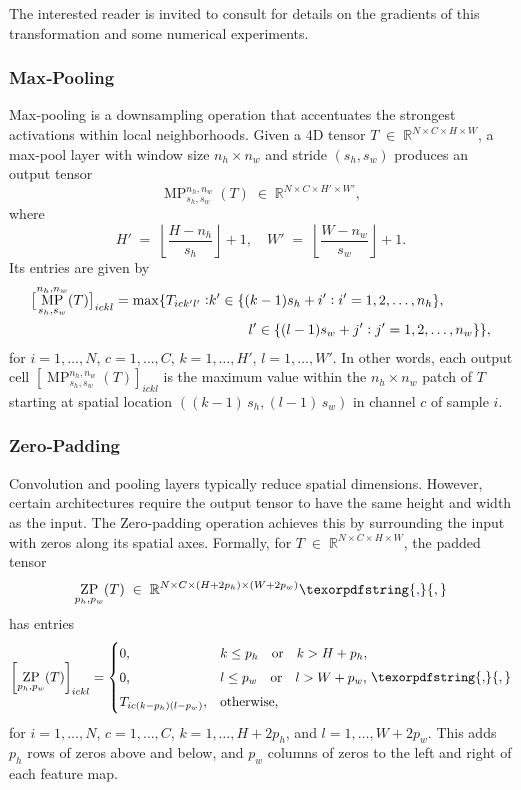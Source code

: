 \documentclass[10pt,a4paper,oneside]{article}
\DeclareMathOperator{\maxpool}{MP}
\DeclareMathOperator{\zeropad}{ZP}
\providecommand{\DIFaddtex}[1]{{\protect\color{blue} \sf #1}} %
\providecommand{\DIFaddbegin}{} %
\providecommand{\DIFaddend}{} %
\providecommand{\DIFadd}[1]{\texorpdfstring{\DIFaddtex{#1}}{#1}} %
\newcommand{\DIFaddincludegraphics}[2][]{{\color{blue}\fbox{\DIFOincludegraphics[#1]{#2}}}} %
\DeclareRobustCommand{\DIFaddbegin}{\DIFOaddbegin \let\includegraphics\DIFaddincludegraphics} %
\DeclareRobustCommand{\DIFaddend}{\DIFOaddend \let\includegraphics\DIFOincludegraphics} %
\begin{document}
The interested reader is invited to consult \cite{ioffe2015} for details on the gradients of this transformation and some numerical experiments. 

\subsubsection{Max‐Pooling}

Max‐pooling is a downsampling operation that accentuates the strongest activations within local neighborhoods.  Given a 4D tensor $T \;\in\; \mathbb{R}^{N \times C \times H \times W}$, a max‐pool layer with window size \(n_h \times n_w\) and stride \((s_h,s_w)\) produces an output tensor 
\[
\maxpool^{n_h,n_w}_{s_h,s_w}(T)
\;\in\;
\mathbb{R}^{N \times C \times H' \times W'},
\]
where
\[
H' \;=\;\left\lfloor\frac{H - n_h}{s_h}\right\rfloor + 1,
\quad
W' \;=\;\left\lfloor\frac{W - n_w}{s_w}\right\rfloor + 1.
\]
Its entries are given by
\begin{align*}
    \bigl[\maxpool^{n_h, n_w}_{s_h, s_w}(T)\bigr]_{ickl} = \max \{ T_{ick'l'} :  &k' \in \{ (k - 1) s_h + i' : i' = 1, 2, \dots, n_h \},\\
    &\hspace{10mm} l' \in \{ (l - 1) s_w + j' : j' = 1, 2, \dots, n_w \}\},
\end{align*}
for $i=1,\dots,N$,\; $c=1,\dots,C$,\; $k=1,\dots,H'$,\;
$l=1,\dots,W'$. In other words, each output cell $\left[\maxpool^{n_h, n_w}_{s_h, s_w}(T)\right]_{ickl}$ is the maximum value within the \(n_h\times n_w\) patch of \(T\) starting at spatial location \(((k - 1)\,s_h, (l - 1) \,s_w)\) in channel \(c\) of sample \(i\).


\subsubsection{Zero‐Padding}

Convolution and pooling layers typically reduce spatial dimensions.  However, certain architectures require the output tensor to have the same height and width as the input.  The Zero-padding operation achieves this by surrounding the input with zeros along its spatial axes.  Formally, for $T \;\in\; \mathbb{R}^{N \times C \times H \times W}$, the padded tensor
\[
\zeropad_{p_h,p_w}(T)
\;\in\;
\mathbb{R}^{N \times C \times (H + 2p_h) \times (W + 2p_w)}\DIFaddbegin \DIFadd{,
}\DIFaddend \]
has entries
\[
\left[\zeropad_{p_h,p_w}(T)\right]_{ickl}
=
\begin{cases}
0, & k \le p_h \quad\text{or}\quad k > H + p_h,\\[4pt]
0, & l \le p_w \quad\text{or}\quad l > W + p_w,\\[4pt]
T_{ic(k - p_h)(l - p_w)}, & \text{otherwise},
\end{cases}\DIFaddbegin \DIFadd{,
}\DIFaddend \]
for \(i=1,\dots,N\), \(c=1,\dots,C\), \(k=1,\dots,H+2p_h\), and \(l=1,\dots,W+2p_w\).  This adds \(p_h\) rows of zeros above and below, and \(p_w\) columns of zeros to the left and right of each feature map.
\end{document}
